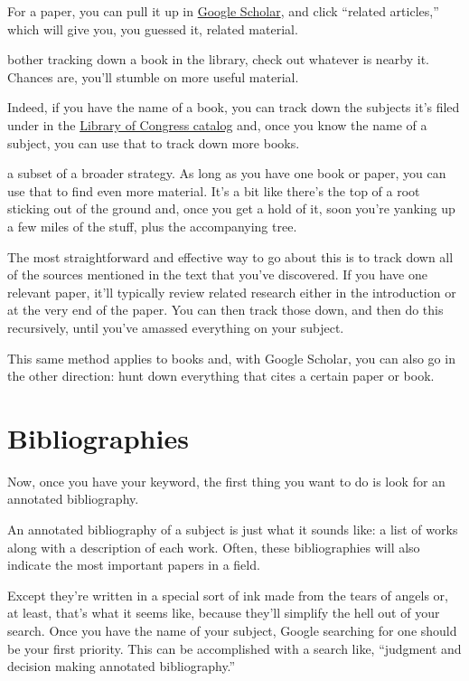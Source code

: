 For a paper, you can pull it up in \href{http://scholar.google.com/}{Google Scholar}, and click ``related
articles,'' which will give you, you guessed it, related material.

 bother tracking down a book in the library, check out whatever
is nearby it. Chances are, you'll stumble on more useful material.

Indeed, if you have the name of a book, you can track down the subjects it's filed under in the
\href{http://catalog.loc.gov/}{Library of Congress catalog} and, once you know the name of a subject, you can use that
to track down more books.

 a subset of a broader strategy. As long as you have one
book or paper, you can use that to find even more material. It's a bit like
there's the top of a root sticking out of the ground and, once you get a hold of
it, soon you're yanking up a few miles of the stuff, plus the accompanying tree.

The most straightforward and effective way to go about this is to track down all
of the sources mentioned in the text that you've discovered. If you have one
relevant paper, it'll typically review related research either in the
introduction or at the very end of the paper. You can then track those down, and
then do this recursively, until you've amassed everything on your
subject.

This same method applies to books and, with Google Scholar, you can also go in
the other direction: hunt down everything that cites a certain paper or book.

\section{Bibliographies}

Now, once you have your keyword, the first thing you want to do is look for an
annotated bibliography.

An annotated bibliography of a subject is just what it sounds like: a list of
works along with a description of each work. Often, these bibliographies will
also indicate the most important papers in a field.

Except they're written in a special sort of ink made from the tears of angels
or, at least, that's what it seems like, because they'll simplify the hell out
of your search.  Once you have the
name of your subject, Google searching for one should be your first
priority. This can be accomplished with a search like, ``judgment and decision
making annotated bibliography.''

